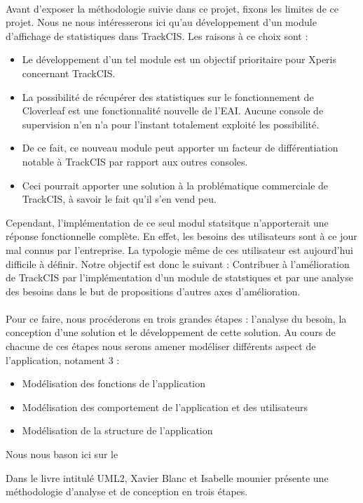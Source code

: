			\paragraph{}%
			Avant d'exposer la méthodologie suivie dans ce projet, fixons les limites de
			ce projet. Nous ne nous intéresserons ici qu'au développement d'un
			module d'affichage de statistiques dans TrackCIS. Les raisons à ce choix sont
			:
			\begin{itemize}
			  \item Le développement d'un tel module est un objectif prioritaire pour
			  Xperis concernant TrackCIS.
			  \item La possibilité de récupérer des statistiques sur le fonctionnement de
			  Cloverleaf est une fonctionnalité nouvelle de l'EAI. Aucune console de
			  supervision n'en n'a pour l'instant totalement exploité les possibilité.
			  \item De ce fait, ce nouveau module peut apporter un facteur de
			  différentiation notable à TrackCIS par rapport aux outres consoles.
			  \item Ceci pourrait apporter une solution à la problématique commerciale
			  de TrackCIS, à savoir le fait qu'il s'en vend peu.
			\end{itemize}
			Cependant, l'implémentation de ce seul modul statsitque n'apporterait une
			réponse fonctionnelle complète. En effet, les besoins des utilisateurs sont à
			ce jour mal connus par l'entreprise. La typologie même de ces utilisateur est
			aujourd'hui difficile à définir.\newline
			Notre objectif est donc le suivant :\newline
			Contribuer à l'amélioration de TrackCIS par l'implémentation d'un module de
			statstiques et par une analyse des besoins dans le but de propositions
			d'autres axes d'amélioration.
			
			\paragraph{}%
			Pour ce faire, nous procéderons en trois grandes étapes : l'analyse du
			besoin, la conception d'une solution et le développement de cette
			solution. Au cours de chacune de ces étapes nous serons amener  modéliser
			différents aspect de l'application, notament 3 :
			\begin{itemize}
			  \item Modélisation des fonctions de l'application
			  \item Modélisation des comportement de l'application et des utilisateurs
			  \item Modélisation de la structure de l'application
			\end{itemize}
			Nous nous bason ici sur le
			
			Dans le livre intitulé UML2, Xavier Blanc et Isabelle mounier présente une
			méthodologie d'analyse et de conception en trois étapes.
			
			\paragraph{}%
			
			
			
			
			
			